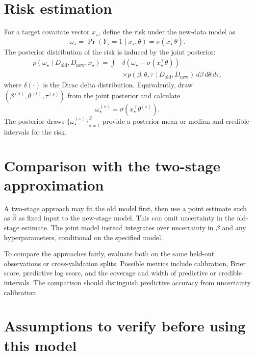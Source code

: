 \documentclass[11pt,a4paper]{article}
\begin{document}
\section{Risk estimation}

For a target covariate vector $x_\star$, define the risk under the new-data model as
\[
\omega_\star=\Pr(Y_\star=1\mid x_\star,\theta)
=\sigma(x_\star^\top\theta).
\]
The posterior distribution of the risk is induced by the joint posterior:
\begin{align}
p(\omega_\star\mid D_{\mathrm{old}},D_{\mathrm{new}},x_\star)
=\int &\delta\!\left(\omega_\star-\sigma(x_\star^\top\theta)\right)\\
&\times p(\beta,\theta,\tau\mid D_{\mathrm{old}},D_{\mathrm{new}})
\,d\beta\,d\theta\,d\tau,
\end{align}
where $\delta(\cdot)$ is the Dirac delta distribution. Equivalently, draw $(\beta^{(s)},\theta^{(s)},\tau^{(s)})$ from the joint posterior and calculate
\[
\omega_\star^{(s)}=\sigma(x_\star^\top\theta^{(s)}).
\]
The posterior draws $\{\omega_\star^{(s)}\}_{s=1}^S$ provide a posterior mean or median and credible intervals for the risk.

\section{Comparison with the two-stage approximation}

A two-stage approach may fit the old model first, then use a point estimate such as $\widehat\beta$ as fixed input to the new-stage model. This can omit uncertainty in the old-stage estimate. The joint model instead integrates over uncertainty in $\beta$ and any hyperparameters, conditional on the specified model.

To compare the approaches fairly, evaluate both on the same held-out observations or cross-validation splits. Possible metrics include calibration, Brier score, predictive log score, and the coverage and width of predictive or credible intervals. The comparison should distinguish predictive accuracy from uncertainty calibration.

\section{Assumptions to verify before using this model}
\end{document}
